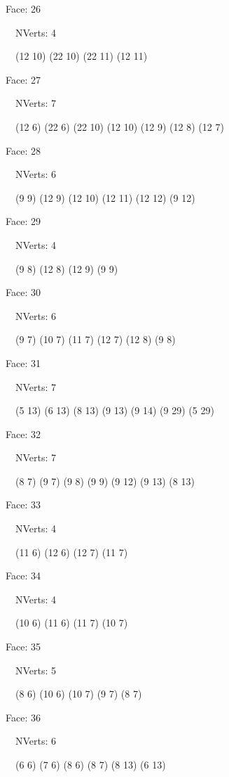 \documentclass{article}
\begin{document}
{\footnotesize 

Face: 26

\   \    NVerts: 4

 \   \   (12 10) (22 10) (22 11) (12 11)}

{\footnotesize 

Face: 27

\   \    NVerts: 7

 \   \   (12 6) (22 6) (22 10) (12 10) (12 9) (12 8) (12 7)}

{\footnotesize 

Face: 28

\   \    NVerts: 6

 \   \   (9 9) (12 9) (12 10) (12 11) (12 12) (9 12)}

{\footnotesize 

Face: 29

\   \    NVerts: 4

 \   \   (9 8) (12 8) (12 9) (9 9)}

{\footnotesize 

Face: 30

\   \    NVerts: 6

 \   \   (9 7) (10 7) (11 7) (12 7) (12 8) (9 8)}

{\footnotesize 

Face: 31

\   \    NVerts: 7

 \   \   (5 13) (6 13) (8 13) (9 13) (9 14) (9 29) (5 29)}

{\footnotesize 

Face: 32

\   \    NVerts: 7

 \   \   (8 7) (9 7) (9 8) (9 9) (9 12) (9 13) (8 13)}

{\footnotesize 

Face: 33

\   \    NVerts: 4

 \   \   (11 6) (12 6) (12 7) (11 7)}

{\footnotesize 

Face: 34

\   \    NVerts: 4

 \   \   (10 6) (11 6) (11 7) (10 7)}

{\footnotesize 

Face: 35

\   \    NVerts: 5

 \   \   (8 6) (10 6) (10 7) (9 7) (8 7)}

{\footnotesize 

Face: 36

\   \    NVerts: 6

 \   \   (6 6) (7 6) (8 6) (8 7) (8 13) (6 13)}
\end{document}

